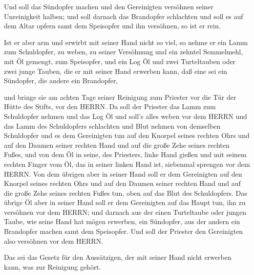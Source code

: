  Und soll das Sündopfer machen und den Gereinigten
versöhnen seiner Unreinigkeit halben; und soll darnach das Brandopfer
schlachten  und soll es auf dem Altar opfern samt dem
Speisopfer und ihn versöhnen, so ist er rein.

 Ist er aber arm und erwirbt mit seiner Hand nicht so viel,
so nehme er ein Lamm zum Schuldopfer, zu weben, zu seiner Versöhnung und
ein zehntel Semmelmehl, mit Öl gemengt, zum Speisopfer, und ein Log Öl
 und zwei Turteltauben oder zwei junge Tauben, die er mit
seiner Hand erwerben kann, daß eine sei ein Sündopfer, die andere ein
Brandopfer,

 und bringe sie am achten Tage seiner Reinigung zum
Priester vor die Tür der Hütte des Stifts, vor den HERRN. 
Da soll der Priester das Lamm zum Schuldopfer nehmen und das Log Öl und
soll's alles weben vor dem HERRN  und das Lamm des
Schuldopfers schlachten und Blut nehmen von demselben Schuldopfer und es
dem Gereinigten tun auf den Knorpel seines rechten Ohrs und auf den
Daumen seiner rechten Hand und auf die große Zehe seines rechten Fußes,
 und von dem Öl in seine, des Priesters, linke Hand gießen
 und mit seinem rechten Finger vom Öl, das in seiner linken
Hand ist, siebenmal sprengen vor dem HERRN.  Von dem
übrigen aber in seiner Hand soll er dem Gereinigten auf den Knorpel
seines rechten Ohrs und auf den Daumen seiner rechten Hand und auf die
große Zehe seines rechten Fußes tun, oben auf das Blut des Schuldopfers.
 Das übrige Öl aber in seiner Hand soll er dem Gereinigten
auf das Haupt tun, ihn zu versöhnen vor dem HERRN;  und
darnach aus der einen Turteltaube oder jungen Taube, wie seine Hand hat
mögen erwerben,  ein Sündopfer, aus der andern ein
Brandopfer machen samt dem Speisopfer. Und soll der Priester den
Gereinigten also versöhnen vor dem HERRN.

 Das sei das Gesetz für den Aussätzigen, der mit seiner
Hand nicht erwerben kann, was zur Reinigung gehört.

